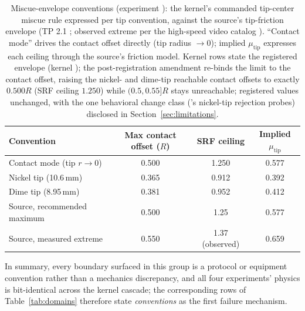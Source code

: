 \begin{table}[htbp]
  \centering
  \caption{Miscue-envelope conventions (experiment ): the
  kernel's commanded tip-center miscue rule expressed per tip
  convention, against the source's tip-friction envelope (TP 2.1
  \citep{alciatore_tp_catalog}; observed extreme per the high-speed
  video catalog \citep{alciatore_hsv_catalog}). ``Contact mode'' drives
  the contact offset directly (tip radius $\to 0$); implied
  $\mu_{\mathrm{tip}}$ expresses each ceiling through the source's
  friction model. Kernel rows state the registered envelope (kernel
  ); the post-registration amendment re-binds
  the limit to the contact offset, raising the nickel- and dime-tip
  reachable contact offsets to exactly $0.500R$ (SRF ceiling $1.250$)
  while $(0.5, 0.55]R$ stays unreachable; registered values unchanged,
  with the one behavioral change class ('s nickel-tip
  rejection probes) disclosed in Section~\ref{sec:limitations}.}
  \label{tab:miscue-conventions}
  \footnotesize
  \setlength{\tabcolsep}{3.5pt}
  \begin{tabular}{lccc}
    \toprule
    Convention & Max contact offset ($R$) & SRF ceiling &
    Implied $\mu_{\mathrm{tip}}$ \\
    \midrule
    Contact mode (tip $r \to 0$) & 0.500 & 1.250 & 0.577 \\
    Nickel tip (10.6\,mm)        & 0.365 & 0.912 & 0.392 \\
    Dime tip (8.95\,mm)          & 0.381 & 0.952 & 0.412 \\
    \midrule
    Source, recommended maximum  & 0.500 & 1.25  & 0.577 \\
    Source, measured extreme     & 0.550 & 1.37 (observed) & 0.659 \\
    \bottomrule
  \end{tabular}
\end{table}

In summary, every boundary surfaced in this group is a protocol or
equipment convention rather than a mechanics discrepancy, and all four
experiments' physics is bit-identical across the kernel cascade; the
corresponding rows of Table~\ref{tab:domains} therefore state
\emph{conventions} as the first failure mechanism.


